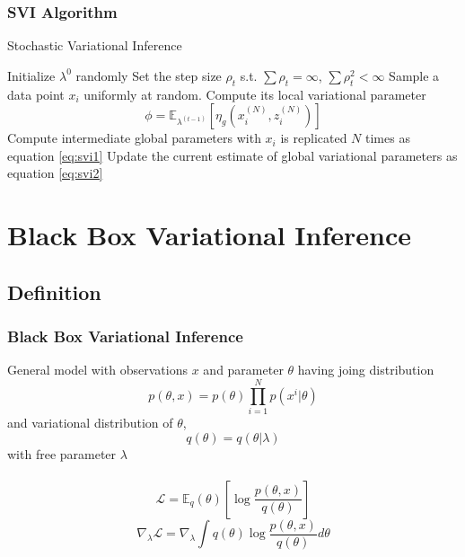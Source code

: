 \documentclass{beamer}
\newcommand{\E}{\mathbb{E}}
\renewcommand{\L}{\mathcal{L}}
\begin{document}
\begin{frame}
\frametitle{SVI Algorithm}
\begin{algorithm}[H]
	\caption{Stochastic Variational Inference}
	\label{icTree}
	\begin{algorithmic}[1]
		\STATE Initialize $\lambda^0$ randomly
		\STATE Set the step size $\rho_t$ s.t. $\sum \rho_t=\infty$, $\sum \rho_t^2<\infty$
		\REPEAT 
			\STATE Sample a data point $x_i$ uniformly at random.
			\STATE Compute its local variational parameter
			\STATE \begin{equation*}
			\phi = \E_{\lambda^{(t-1)}}[\eta_g(x_i^{(N)},z_i^{(N)})]
			\end{equation*}
			\STATE Compute intermediate global parameters with $x_i$ is replicated $N$ times as equation \ref{eq:svi1}
		\STATE Update the current estimate of global variational parameters as equation \ref{eq:svi2}
	\end{algorithmic}
\end{algorithm}
\end{frame}

\section{Black Box Variational Inference}

\subsection{Definition}
\begin{frame}
\frametitle{Black Box Variational Inference}
General model with observations $x$ and parameter $\theta$ having joing distribution
\[
p(\theta,x)=p(\theta)\prod_{i=1}^{N}p(x^i|\theta)
\]
and variational distribution of $\theta$,
\[
q(\theta)=q(\theta|\lambda)
\]
with free parameter $\lambda$\\~\\
\[
\L=\E_q(\theta)\left[\log\frac{p(\theta,x)}{q(\theta)}\right]
\]
\[
\nabla_\lambda\L = \nabla_\lambda\int q(\theta)\log\frac{p(\theta,x)}{q(\theta)}d\theta
\]
\end{frame}
\end{document}
